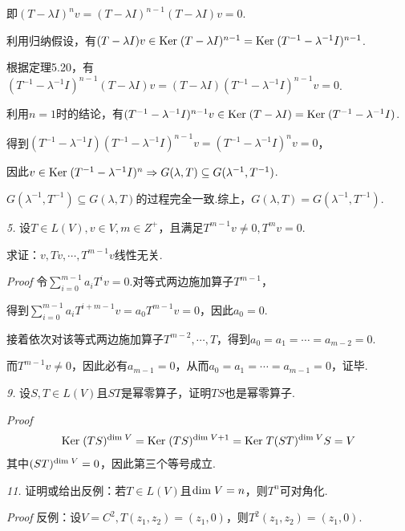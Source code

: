 即\((T-\lambda I)^n v=(T-\lambda I)^{n-1}(T-\lambda I)v=0\).

利用归纳假设，有\((T-\lambda I)v \in \mathrm{Ker \;} (T-\lambda I)^{n-1}=\mathrm{Ker \;} (T^{-1}-\lambda^{-1} I)^{n-1}\).

根据定理5.20，有\((T^{-1}-\lambda^{-1} I)^{n-1}(T-\lambda I)v=(T-\lambda I)(T^{-1}-\lambda^{-1} I)^{n-1}v=0\).

利用\(n=1\)时的结论，有\((T^{-1}-\lambda^{-1} I)^{n-1}v \in \mathrm{Ker \;} (T-\lambda I)=\mathrm{Ker \;} (T^{-1}-\lambda^{-1} I)\).

得到\((T^{-1}-\lambda^{-1} I)(T^{-1}-\lambda^{-1} I)^{n-1}v=(T^{-1}-\lambda^{-1} I)^n v=0\)，

因此\(v \in \mathrm{Ker \;} (T^{-1}-\lambda^{-1} I)^n \Rightarrow G(\lambda,T) \subseteq G(\lambda^{-1},T^{-1})\).

\(G(\lambda^{-1},T^{-1}) \subseteq G(\lambda,T)\)的过程完全一致.综上，\(G(\lambda,T)=G(\lambda^{-1},T^{-1})\).

\hspace*{\fill}

\textit{5.}
设\(T \in L(V),v \in V,m \in Z^+\)，且满足\(T^{m-1}v \ne 0,T^m v=0\).

求证：\(v,Tv,\cdots,T^{m-1}v\)线性无关.

\textit{Proof}
令\(\sum_{i=0}^{m-1} a_iT^i v=0\).对等式两边施加算子\(T^{m-1}\)，

得到\(\sum_{i=0}^{m-1} a_iT^{i+m-1} v=a_0T^{m-1} v=0\)，因此\(a_0=0\).

接着依次对该等式两边施加算子\(T^{m-2},\cdots,T\)，得到\(a_0=a_1=\cdots=a_{m-2}=0\).

而\(T^{m-1}v \ne 0\)，因此必有\(a_{m-1}=0\)，从而\(a_0=a_1=\cdots=a_{m-1}=0\)，证毕.

\hspace*{\fill}

\textit{9.}
设\(S,T \in L(V)\)且\(ST\)是幂零算子，证明\(TS\)也是幂零算子.

\textit{Proof}
    \begin{align*}
        \mathrm{Ker \;} (TS)^{\mathrm{dim \;} V}=\mathrm{Ker \;} (TS)^{\mathrm{dim \;} V+1}=\mathrm{Ker \;} T(ST)^{\mathrm{dim \;} V}S=V
    \end{align*}
其中\((ST)^{\mathrm{dim \;} V}=0\)，因此第三个等号成立.

\hspace*{\fill}

\textit{11.}
证明或给出反例：若\(T \in L(V)\)且\(\mathrm{dim \;} V=n\)，则\(T^n\)可对角化.

\textit{Proof}
反例：设\(V=C^2,T(z_1,z_2)=(z_1,0)\)，则\(T^2(z_1,z_2)=(z_1,0)\).

